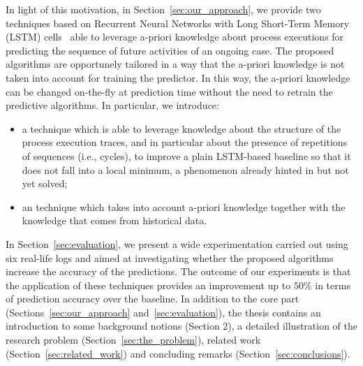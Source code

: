 In light of this motivation, in Section~\ref{sec:our_approach}, we provide two techniques based on Recurrent Neural Networks with Long Short-Term Memory (LSTM) cells~\cite{hochreiter1997long} able to leverage a-priori knowledge about process executions for predicting the sequence of future activities of an ongoing case. The proposed algorithms are opportunely tailored in a way that the a-priori knowledge is not taken into account for training the predictor. In this way, the a-priori knowledge can be changed on-the-fly at prediction time without the need to retrain the predictive algorithms.
In particular, we introduce:
\begin{itemize}
	\item a \nocycle technique which is able to leverage knowledge about the structure of the process execution traces, and in particular about the presence of repetitions of sequences (i.e., cycles), to improve a plain LSTM-based baseline so that it does not fall into a local minimum, a phenomenon already hinted in \cite{niek96732} but not yet solved;
	\item an \protrack technique which takes into account a-priori knowledge together with the knowledge that comes from historical data.
\end{itemize}
In Section~\ref{sec:evaluation}, we present a wide experimentation carried out using six real-life logs and aimed at investigating whether the proposed algorithms increase the accuracy of the predictions. The outcome of our experiments is that the application of these techniques provides an improvement up to $50\%$ in terms of prediction accuracy over the baseline.
In addition to the core part (Sections~\ref{sec:our_approach} and~\ref{sec:evaluation}), the thesis contains an introduction to some background notions (Section 2), a detailed illustration of the research problem (Section~\ref{sec:the_problem}), related work (Section~\ref{sec:related_work}) and concluding remarks (Section~\ref{sec:conclusions}).


